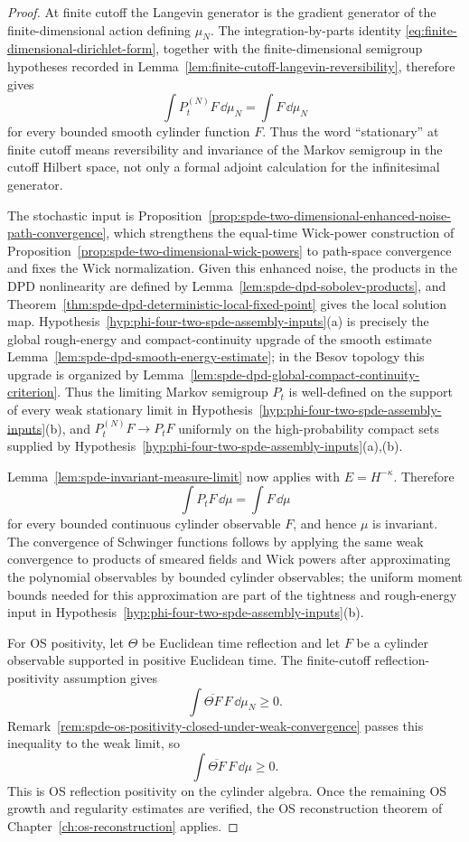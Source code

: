 \begin{proof}
At finite cutoff the Langevin generator is the gradient generator of the
finite-dimensional action defining \(\mu_N\).  The integration-by-parts
identity \eqref{eq:finite-dimensional-dirichlet-form}, together with the
finite-dimensional semigroup hypotheses recorded in
Lemma~\ref{lem:finite-cutoff-langevin-reversibility}, therefore gives
\[
  \int P_t^{(N)}F\,\dd\mu_N=\int F\,\dd\mu_N
\]
for every bounded smooth cylinder function \(F\).  Thus the word
``stationary'' at finite cutoff means reversibility and invariance of the
Markov semigroup in the cutoff Hilbert space, not only a formal adjoint
calculation for the infinitesimal generator.

The stochastic input is
Proposition~\ref{prop:spde-two-dimensional-enhanced-noise-path-convergence},
which strengthens the equal-time Wick-power construction of
Proposition~\ref{prop:spde-two-dimensional-wick-powers} to path-space
convergence and fixes the Wick normalization.  Given this enhanced noise,
the products in the DPD nonlinearity are defined by
Lemma~\ref{lem:spde-dpd-sobolev-products}, and
Theorem~\ref{thm:spde-dpd-deterministic-local-fixed-point} gives the local
solution map.  Hypothesis~\ref{hyp:phi-four-two-spde-assembly-inputs}\textup{(a)}
is precisely the global rough-energy and
compact-continuity upgrade of the smooth estimate
	Lemma~\ref{lem:spde-dpd-smooth-energy-estimate}; in the Besov
topology this upgrade is organized by
Lemma~\ref{lem:spde-dpd-global-compact-continuity-criterion}.  Thus
the limiting Markov semigroup \(P_t\) is well-defined on the support of every
weak stationary limit in
Hypothesis~\ref{hyp:phi-four-two-spde-assembly-inputs}\textup{(b)}, and
\(P_t^{(N)}F\to P_tF\) uniformly on the high-probability compact sets supplied
by Hypothesis~\ref{hyp:phi-four-two-spde-assembly-inputs}\textup{(a),(b)}.

Lemma~\ref{lem:spde-invariant-measure-limit} now applies with
\(E=H^{-\kappa}\).  Therefore
\[
  \int P_tF\,\dd\mu=\int F\,\dd\mu
\]
for every bounded continuous cylinder observable \(F\), and hence \(\mu\) is
invariant.  The convergence of Schwinger functions follows by applying the
same weak convergence to products of smeared fields and Wick powers after
approximating the polynomial observables by bounded cylinder observables;
the uniform moment bounds needed for this approximation are part of the
tightness and rough-energy input in
Hypothesis~\ref{hyp:phi-four-two-spde-assembly-inputs}\textup{(b)}.

For OS positivity, let \(\Theta\) be Euclidean time reflection and let
\(F\) be a cylinder observable supported in positive Euclidean time.  The
finite-cutoff reflection-positivity assumption gives
\[
  \int \overline{\Theta F}\,F\,\dd\mu_N\geq0 .
\]
Remark~\ref{rem:spde-os-positivity-closed-under-weak-convergence}
passes this inequality to the weak limit, so
\[
  \int \overline{\Theta F}\,F\,\dd\mu\geq0 .
\]
This is OS reflection positivity on the cylinder algebra.  Once the
remaining OS growth and regularity estimates are verified, the OS
reconstruction theorem of Chapter~\ref{ch:os-reconstruction} applies.
\end{proof}

